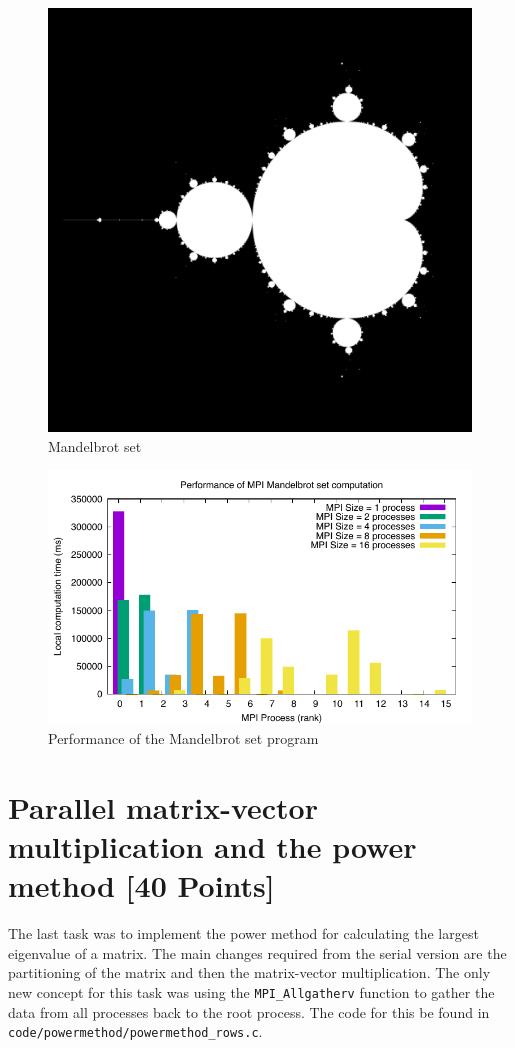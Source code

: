 \documentclass[unicode,11pt,a4paper,oneside,numbers=endperiod,openany]{scrartcl}
\begin{document}
\begin{figure}
      \centering
      \includegraphics[width=.5\linewidth]{plots/mandel.png}
      \caption{Mandelbrot set}
      \label{fig:mandelbrot}
\end{figure}

\begin{figure}
      \centering
      \includegraphics[width=.8\linewidth]{plots/mandel_perf.pdf}
      \caption{Performance of the Mandelbrot set program}
      \label{fig:mandelbrot_perf}
\end{figure}


\section{Parallel matrix-vector multiplication and the power method
        [40 Points]}

The last task was to implement the power method for calculating the largest eigenvalue of a matrix. The main changes required from the serial version are the partitioning of the matrix and then the matrix-vector multiplication. The only new concept for this task was using the \texttt{MPI\_Allgatherv} function to gather the data from all processes back to the root process. The code for this be found in \texttt{code/powermethod/powermethod\_rows.c}.
\end{document}

